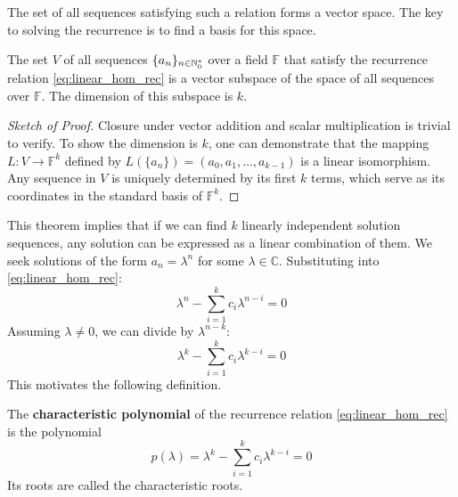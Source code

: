 The set of all sequences satisfying such a relation forms a vector space. The key to solving the recurrence is to find a basis for this space.

\begin{theorem}
The set $V$ of all sequences $\{a_n\}_{n \in \mathbb{N}_{0}^*}$ over a field $\mathbb{F}$ that satisfy the recurrence relation \eqref{eq:linear_hom_rec} is a vector subspace of the space of all sequences over $\mathbb{F}$. The dimension of this subspace is $k$.
\end{theorem}
\begin{proof}[Sketch of Proof]
Closure under vector addition and scalar multiplication is trivial to verify. To show the dimension is $k$, one can demonstrate that the mapping $L: V \to \mathbb{F}^k$ defined by $L(\{a_n\}) = (a_0, a_1, \dots, a_{k-1})$ is a linear isomorphism. Any sequence in $V$ is uniquely determined by its first $k$ terms, which serve as its coordinates in the standard basis of $\mathbb{F}^k$.
\end{proof}

This theorem implies that if we can find $k$ linearly independent solution sequences, any solution can be expressed as a linear combination of them. We seek solutions of the form $a_n = \lambda^n$ for some $\lambda \in \mathbb{C}$. Substituting into \eqref{eq:linear_hom_rec}:
$$ \lambda^n - \sum_{i=1}^{k} c_i \lambda^{n-i} = 0 $$
Assuming $\lambda \neq 0$, we can divide by $\lambda^{n-k}$:
$$ \lambda^k - \sum_{i=1}^{k} c_i \lambda^{k-i} = 0 $$
This motivates the following definition.

\begin{definition}
The \textbf{characteristic polynomial} of the recurrence relation \eqref{eq:linear_hom_rec} is the polynomial
\begin{equation}\label{eq:char_poly}
p(\lambda) = \lambda^k - \sum_{i=1}^{k} c_i \lambda^{k-i} = 0
\end{equation}
Its roots are called the characteristic roots.
\end{definition}

